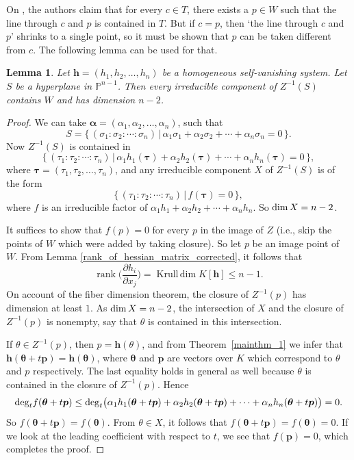 \documentclass[12pt]{article}
\newtheorem{lemma}[theorem]{Lemma}
\theoremstyle{definition}
\theoremstyle{remark}
\def\dim{{\rm dim}}
\def\deg{{\rm deg}}
\def\pa{\partial}
\newcommand {\PP}{\mathbb{P}}
\def\rk{\operatorname{rank}}
\def\krdim{\operatorname{Krull\,dim}}
\def\parder#1#2{\frac{\pa #1}{\pa #2}}
\begin{document}
On \cite[p.\@ 565]{GNzzz}, the authors claim that for every $c \in T$, there exists a
$p \in W$ such that the line through $c$ and $p$ is contained in $T$. 
But if $c = p$, then `the line through $c$ and $p$' shrinks to a single point, so
it must be shown that $p$ can be taken different from $c$. The following lemma
can be used for that.

\begin{lemma} \label{X}
Let $\bm{h} = (h_1, h_2, \ldots,h_n)$ be a homogeneous self-vanishing system. 
Let $S$ be a hyperplane in $\PP^{n-1}$. Then every irreducible component of $Z^{-1}(S)$
contains $W$ and has dimension $n-2$.
\end{lemma}

\begin{proof}
We can take $\bm{\alpha} = (\alpha_1,\alpha_2,\ldots,\alpha_n)$,
such that
$$
S = \big\{\,(\sigma_1 : \sigma_2 : \cdots : \sigma_n)\,\big|\,
\alpha_1 \sigma_1 + \alpha_2 \sigma_2 + \cdots + \alpha_n \sigma_n = 0\,\}.
$$
Now $Z^{-1}(S)$ is contained in
$$
\big\{\,(\tau_1 : \tau_2 : \cdots : \tau_n)\,\big|\,
\alpha_1 h_1(\bm{\tau}) + \alpha_2 h_2(\bm{\tau}) + \cdots + \alpha_n h_n(\bm{\tau}) = 0\,\},
$$
where $\bm{\tau} = (\tau_1,\tau_2,\ldots,\tau_n)$, and any irreducible component $X$ of $Z^{-1}(S)$ is of the form 
$$
\big\{\,(\tau_1 : \tau_2 : \cdots : \tau_n)\,\big|\,f(\bm{\tau}) = 0\,\},
$$
where $f$ is an irreducible factor of 
$\alpha_1 h_1 + \alpha_2 h_2 + \cdots + \alpha_n h_n$. So $\dim\, X = n-2$.

It suffices to show that $f(p) = 0$ for every $p$ in the image of $Z$
(i.e., skip the points of $W$ which were added by taking closure).
So let $p$ be an image point of $W$. From Lemma 
\ref{rank_of_hessian_matrix_corrected}, it follows
that
\[
\rk \Big(\parder{h_i}{x_j}\Big) = \krdim K[\bm{h}] \le n-1.
\]
On account of the fiber dimension theorem, the closure of $Z^{-1}(p)$ 
has dimension at least $1$. As $\dim\, X = n-2$,
the intersection of $X$ and the closure of $Z^{-1}(p)$ is nonempty, say that
$\theta$ is contained in this intersection.

If $\theta \in Z^{-1}(p)$, then $p=\bm{h}(\theta)$, and from Theorem~\ref{mainthm_1}
we infer that $\bm{h}(\bm{\theta}+t\bm{p}) = \bm{h}(\bm{\theta})$, where $\bm{\theta}$ and 
$\bm{p}$ are vectors over $K$ which correspond to $\theta$ and $p$ respectively. 
The last equality holds in general as well because $\theta$ is contained in the closure of $Z^{-1}(p)$.  
Hence
$$
\deg_t f(\bm{\theta}+t\bm{p}) \le 
\deg_t \big(\alpha_1 h_1(\bm{\theta}+t\bm{p}) + \alpha_2 h_2(\bm{\theta}+t\bm{p}) + \cdots + 
\alpha_n h_n(\bm{\theta}+t\bm{p})\big) = 0.
$$
So $f(\bm{\theta}+t\bm{p}) = f(\bm{\theta})$. From $\theta \in X$, it follows that 
$f(\bm{\theta}+t\bm{p}) = f(\bm{\theta}) = 0$. If we look at the leading coefficient 
with respect to $t$, we see that $f(\bm{p}) = 0$, which completes the proof.
\end{proof}
\end{document}
